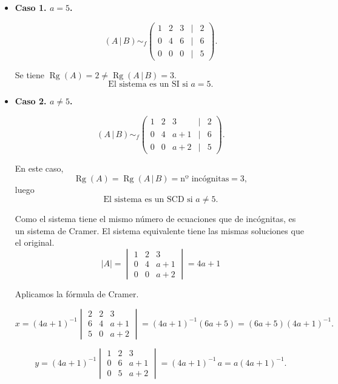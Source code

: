 \documentclass[a4paper,12pt]{article}
\begin{document}
\begin{ejercicio}[title=Ejercicio 30]
\begin{itemize}
\item \textbf{Caso 1. \(a=5\).}

\[
(A\,|\,B)\sim_f
\begin{pmatrix}
1 & 2 & 3 &\Big|& 2\\
0 & 4 & 6 &\Big|& 6\\
0 & 0 & 0 &\Big|& 5
\end{pmatrix}.
\]

Se tiene \(\operatorname{Rg}(A)=2 \neq \operatorname{Rg}(A\,|\,B)=3\).  
\[
\boxed{\text{El sistema es un SI si } a=5.}
\]
\end{itemize}
\end{ejercicio}
\begin{ejercicio}[title=Ejercicio 30]
\begin{itemize}
\item \textbf{Caso 2. \(a\neq 5\).}

\[
(A\,|\,B)\sim_f
\begin{pmatrix}
1 & 2 & 3 &\Big|& 2\\
0 & 4 & a+1 &\Big|& 6\\
0 & 0 & a+2 &\Big|& 5
\end{pmatrix}.
\]

En este caso,
\[
\operatorname{Rg}(A)=\operatorname{Rg}(A\,|\,B)=\text{nº incógnitas}=3,
\]
luego
\[
\boxed{\text{El sistema es un SCD si } a\neq 5.}
\]

Como el sistema tiene el mismo número de ecuaciones que de incógnitas, es un
sistema de Cramer. El sistema equivalente tiene las mismas soluciones que el original.
\[
|A|=
\begin{vmatrix}
1 & 2 & 3\\
0 & 4 & a+1\\
0 & 0 & a+2
\end{vmatrix}
=4a+1
\]

Aplicamos la fórmula de Cramer.

\[
x=(4a+1)^{-1}
\begin{vmatrix}
2 & 2 & 3\\
6 & 4 & a+1\\
5 & 0 & a+2
\end{vmatrix}
=(4a+1)^{-1}(6a+5)
=\boxed{(6a+5)(4a+1)^{-1}}.
\]

\[
y=(4a+1)^{-1}
\begin{vmatrix}
1 & 2 & 3\\
0 & 6 & a+1\\
0 & 5 & a+2
\end{vmatrix}
=(4a+1)^{-1}\,a
=\boxed{a(4a+1)^{-1}}.
\]


\end{itemize}
\end{ejercicio}
\end{document}

